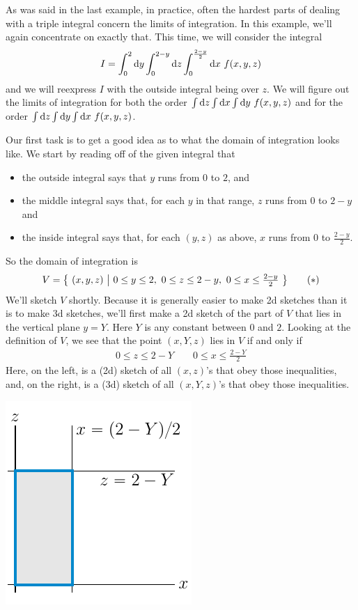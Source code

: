 \begin{eg}\label{eg 3d integrals exchange of order}
As was said in the last example, in practice, often the hardest parts of 
dealing with a triple integral concern the limits of integration.
In this example, we'll again concentrate on exactly that. This time, we will consider the integral
\begin{equation*}
I=\int_0^2\dee{y}\int_0^{2-y}\dee{z}\int_0^{\frac{2-y}{2}}\dee{x}\ f(x,y,z)
\end{equation*}
and we will reexpress $I$ with the outside integral being over $z$. We will 
figure out the limits of integration for both the order 
$\int\mathrm{d}z\int\mathrm{d}x\int\mathrm{d}y\ f(x,y,z)$ and for the order
$\int\dee{z}\int\dee{y}\int\dee{x}\ f(x,y,z)$.

Our first task is to get a good idea as to what the domain of integration looks like. We start by reading off of the given integral that
\begin{itemize} \itemsep1pt \parskip0pt 
\item
the outside integral says that $y$ runs from $0$ to $2$, and
\item
the middle integral says that, for each $y$ in that range, $z$ runs from $0$ to $2-y$ and
\item
the inside integral says that, for each $(y,z)$ as above,
$x$ runs from $0$ to $\frac{2-y}{2}$.
\end{itemize}
So the domain of integration is
\begin{equation*}
V=\Set{(x,y,z)}{ 0\le y\le 2,\ 
                 0\le z\le 2-y,\ 
                 0\le x\le \tfrac{2-y}{2}}
\tag{$*$}\end{equation*}
We'll sketch $V$ shortly. Because it is generally easier to make 2d sketches than it is to make 3d sketches, we'll first make a 2d sketch of the part of $V$ that lies in the vertical plane $y=Y$. Here $Y$ is any constant between 
$0$ and $2$. Looking at the definition of $V$, we see that the point $(x,Y,z)$ 
lies in $V$ if and only if
\begin{align*}
0\le z\le 2-Y\qquad   0\le x\le \frac{2-Y}{2}
\end{align*}
Here, on the left, is a (2d) sketch of all $(x,z)$'s that obey those
inequalities, and, on the right, is a (3d) sketch of all $(x,Y,z)$'s that obey those inequalities.
\begin{efig}
\begin{center}
    \includegraphics{figs_integration/xchange2.pdf}\qquad\qquad

\end{center}
\end{efig}
\end{eg}
